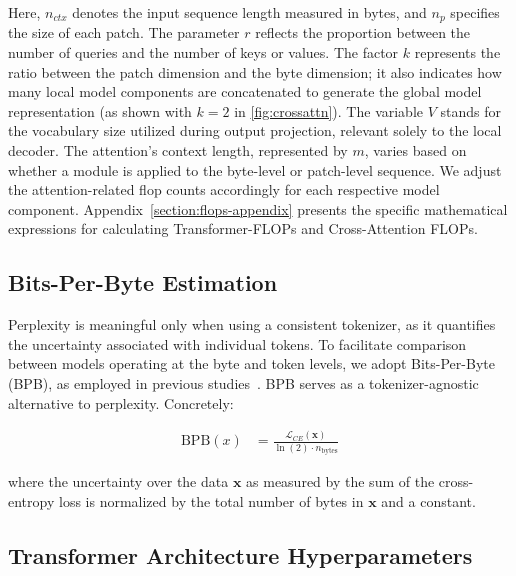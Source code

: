 Here, $n_{ctx}$ denotes the input sequence length measured in bytes, and $n_p$ specifies the size of each patch. The parameter $r$ reflects the proportion between the number of queries and the number of keys or values. The factor $k$ represents the ratio between the patch dimension and the byte dimension; it also indicates how many local model components are concatenated to generate the global model representation (as shown with $k=2$ in \autoref{fig:crossattn}). The variable $V$ stands for the vocabulary size utilized during output projection, relevant solely to the local decoder. The attention's context length, represented by $m$, varies based on whether a module is applied to the byte-level or patch-level sequence. We adjust the attention-related flop counts accordingly for each respective model component. Appendix~\ref{section:flops-appendix} presents the specific mathematical expressions for calculating Transformer-FLOPs and Cross-Attention FLOPs.

\subsection{Bits-Per-Byte Estimation} Perplexity is meaningful only when using a consistent tokenizer, as it quantifies the uncertainty associated with individual tokens. To facilitate comparison between models operating at the byte and token levels, we adopt Bits-Per-Byte (BPB), as employed in previous studies~\citep{xue2022byt5, yu2023megabyte, wang2024mambabyte}. BPB serves as a tokenizer-agnostic alternative to perplexity. Concretely:

\begin{align}
    \text{BPB}(x)&= \frac{\mathcal{L}_{CE}(\pmb{x})}{\ln(2)\cdot n_{\text{bytes}}}
\end{align}

where the uncertainty over the data $\pmb{x}$ as measured by the sum of the cross-entropy loss is normalized by the total number of bytes in $\pmb{x}$ and a constant. 

\subsection{Transformer Architecture Hyperparameters} 

